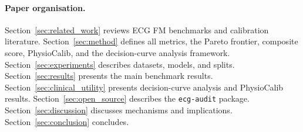 \paragraph{Paper organisation.}
Section~\ref{sec:related_work} reviews ECG FM benchmarks and calibration literature.
Section~\ref{sec:method} defines all metrics, the Pareto frontier, composite score,
PhysioCalib, and the decision-curve analysis framework.
Section~\ref{sec:experiments} describes datasets, models, and splits.
Section~\ref{sec:results} presents the main benchmark results.
Section~\ref{sec:clinical_utility} presents decision-curve analysis and PhysioCalib results.
Section~\ref{sec:open_source} describes the \texttt{ecg-audit} package.
Section~\ref{sec:discussion} discusses mechanisms and implications.
Section~\ref{sec:conclusion} concludes.
